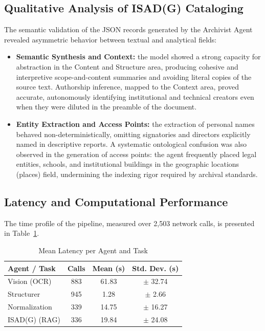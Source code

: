 \documentclass[conference]{IEEEtran}
\begin{document}
\subsection{Qualitative Analysis of ISAD(G) Cataloging}

The semantic validation of the JSON records generated by the Archivist Agent revealed asymmetric behavior between textual and analytical fields:
\begin{itemize}
    \item \textbf{Semantic Synthesis and Context:} the model showed a strong capacity for abstraction in the Content and Structure area, producing cohesive and interpretive scope-and-content summaries and avoiding literal copies of the source text. Authorship inference, mapped to the Context area, proved accurate, autonomously identifying institutional and technical creators even when they were diluted in the preamble of the document.
    \item \textbf{Entity Extraction and Access Points:} the extraction of personal names behaved non-deterministically, omitting signatories and directors explicitly named in descriptive reports. A systematic ontological confusion was also observed in the generation of access points: the agent frequently placed legal entities, schools, and institutional buildings in the geographic locations (places) field, undermining the indexing rigor required by archival standards.
\end{itemize}

\subsection{Latency and Computational Performance}

The time profile of the pipeline, measured over 2,503 network calls, is presented in Table~\ref{tab:latencia_agentes}.

\begin{table}[htbp]
\caption{Mean Latency per Agent and Task}
\label{tab:latencia_agentes}
\centering
\footnotesize
\begin{tabular}{|l|c|c|c|}
\hline
\textbf{Agent / Task} & \textbf{Calls} & \textbf{Mean (s)} & \textbf{Std. Dev. (s)} \\
\hline
Vision (OCR) & 883 & 61.83 & $\pm$ 32.74 \\
\hline
Structurer & 945 & 1.28 & $\pm$ 2.66 \\
\hline
Normalization & 339 & 14.75 & $\pm$ 16.27 \\
\hline
ISAD(G) (RAG) & 336 & 19.84 & $\pm$ 24.08 \\
\hline
\end{tabular}
\end{table}
\end{document}
